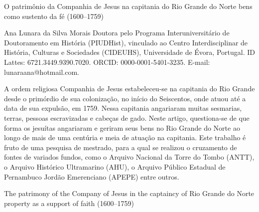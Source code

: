\begin{refsection}
\renewcommand{\thefigure}{\arabic{figure}}

\chapterTwoLines
{O patrimônio da Companhia de Jesus na capitania do Rio Grande do Norte}
{bens como sustento da fé (1600--1759)}
\label{chap:patrimonio}

\articleAuthor
{Ana Lunara da Silva Morais}
{Doutora pelo Programa Interuniversitário de Doutoramento em História (PIUDHist), vinculado ao Centro Interdisciplinar de História, Culturas e Sociedades (CIDEUHS), Universidade de Évora, Portugal. ID Lattes: 6721.3449.9390.7020. ORCID: 0000-0001-5401-3235. E-mail: lunara\textunderscore{}{}ana@hotmail.com.}

\begin{galoResumo}
    A ordem religiosa Companhia de Jesus estabeleceu-se na capitania do Rio
    Grande desde o primórdio de sua colonização, no início do Seiscentos, onde atuou até a data de sua expulsão, em 1759. Nessa capitania angariaram muitas sesmarias, terras, pessoas escravizadas e cabeças de gado. Neste artigo, questiona-se de que forma os jesuítas angariaram e geriram seus bens no Rio Grande do Norte ao longo de mais de uma centúria e meia de atuação na capitania. Este trabalho é fruto de uma pesquisa de mestrado, para a qual se realizou o cruzamento de fontes de variados fundos, como o Arquivo Nacional da Torre do Tombo (ANTT), o Arquivo Histórico Ultramarino (AHU), o Arquivo Público Estadual de Pernambuco Jordão Emerenciano (APEPE) entre outros.
\end{galoResumo}


\begin{otherlanguage}{english}

\fakeChapterTwoLines
{The patrimony of the Company of Jesus in the captaincy of Rio Grande do Norte} {property as a support of faith (1600--1759)}


\end{otherlanguage}
\end{refsection}
